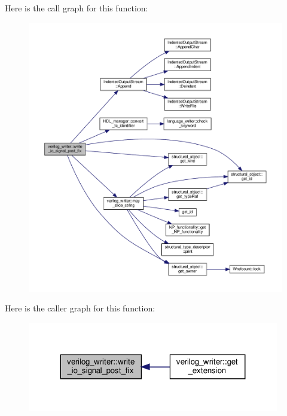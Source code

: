 Here is the call graph for this function\+:
\nopagebreak
\begin{figure}[H]
\begin{center}
\leavevmode
\includegraphics[width=350pt]{d8/dba/classverilog__writer_a4f2930898accd739d654c4afb425814c_cgraph}
\end{center}
\end{figure}
Here is the caller graph for this function\+:
\nopagebreak
\begin{figure}[H]
\begin{center}
\leavevmode
\includegraphics[width=311pt]{d8/dba/classverilog__writer_a4f2930898accd739d654c4afb425814c_icgraph}
\end{center}
\end{figure}
\mbox{\label{classverilog__writer_a271c63e96fc1d6907503b0a0698ef6f8}} 
